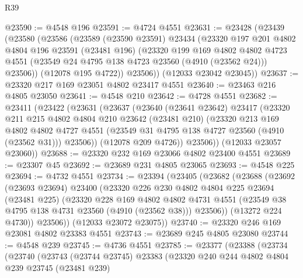\begin{lexlean}{R39}
\begin{coremodule}
@23590 := @4548 @196
@23591 := @4724 @4551
@23631 := @23428
    (@23439
      (@23580
        (@23586
          (@23589
            (@23590 @23591)
            @23434
            (@23320
              @197
              @201
              @4802
              @4804
              @196
              @23591
              (@23481 @196)
              (@23320
                @199
                @169
                @4802
                @4802
                @4723
                @4551
                (@23549 @24 @4795 @138 @4723 @23560 (@4910 (@23562 @24)))
                @23506))
            (@12078 @195 @4722))
          @23506))
      (@12033 @23042 @23045))
@23637 := @23320 @217 @169 @23051 @4802 @23417 @4551
@23640 := @23463 @216 @4805 @23050
@23641 := @4548 @210
@23642 := @4728 @4551
@23682 := @23411
    (@23422
      (@23631
        (@23637
          (@23640
            (@23641 @23642)
            @23417
            (@23320
              @211
              @215
              @4802
              @4804
              @210
              @23642
              (@23481 @210)
              (@23320
                @213
                @169
                @4802
                @4802
                @4727
                @4551
                (@23549 @31 @4795 @138 @4727 @23560 (@4910 (@23562 @31)))
                @23506))
            (@12078 @209 @4726))
          @23506))
      (@12033 @23057 @23060))
@23688 := @23320 @232 @169 @23066 @4802 @23400 @4551
@23689 := @23307 @45
@23692 := @23689 @231 @4805 @23065
@23693 := @4548 @225
@23694 := @4732 @4551
@23734 := @23394
    (@23405
      (@23682
        (@23688
          (@23692
            (@23693 @23694)
            @23400
            (@23320
              @226
              @230
              @4802
              @4804
              @225
              @23694
              (@23481 @225)
              (@23320
                @228
                @169
                @4802
                @4802
                @4731
                @4551
                (@23549 @38 @4795 @138 @4731 @23560 (@4910 (@23562 @38)))
                @23506))
            (@13272 @224 @4730))
          @23506))
      (@12033 @23072 @23075))
@23740 := @23320 @246 @169 @23081 @4802 @23383 @4551
@23743 := @23689 @245 @4805 @23080
@23744 := @4548 @239
@23745 := @4736 @4551
@23785 := @23377
    (@23388
      (@23734
        (@23740
          (@23743
            (@23744 @23745)
            @23383
            (@23320
              @240
              @244
              @4802
              @4804
              @239
              @23745
              (@23481 @239)

\end{coremodule}
\end{lexlean}
